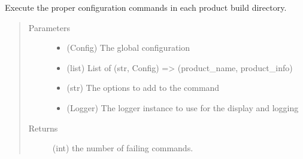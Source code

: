 \documentclass[a4paper,10pt,english]{sphinxmanual}
\begin{document}

\begin{fulllineitems}
\label{\detokenize{apidoc_commands/commands:commands.configure.configure_all_products}}
Execute the proper configuration commands 
in each product build directory.
\begin{quote}\begin{description}
\item[{Parameters}] \leavevmode\begin{itemize}
\item {} 
 \textendash{} (Config) The global configuration

\item {} 
 \textendash{} (list) 
List of (str, Config) =\textgreater{} (product\_name, product\_info)

\item {} 
 \textendash{} (str) The options to add to the command

\item {} 
 \textendash{} (Logger) The logger instance to use for the display and logging

\end{itemize}

\item[{Returns}] \leavevmode
(int) the number of failing commands.

\end{description}\end{quote}

\end{fulllineitems}

\end{document}
